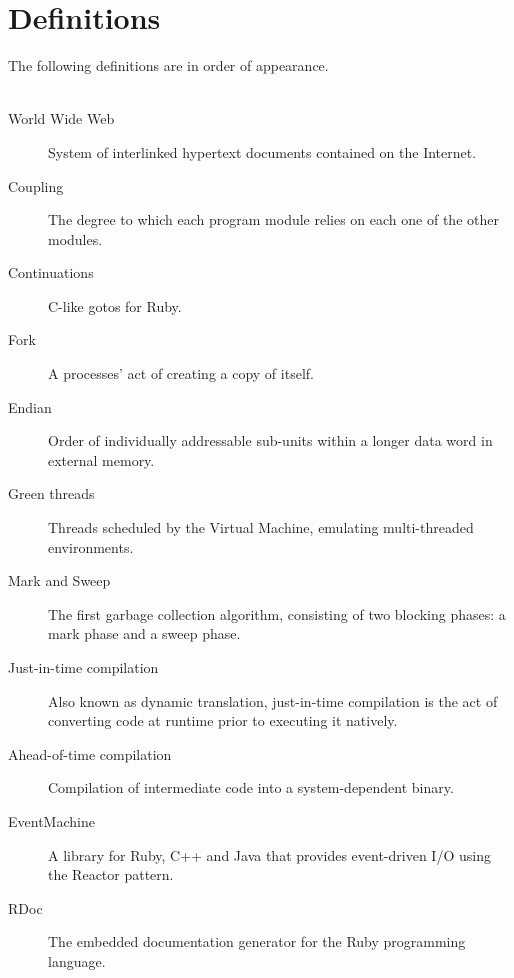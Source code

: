\chapter*{Definitions} %
\label{cha:definitions}
The following definitions are in order of appearance.\\\\

\begin{description}
  \item[World Wide Web] System of interlinked hypertext documents contained on the Internet.
  \item[Coupling] The degree to which each program module relies on each one of the other modules.
  \item[Continuations] C-like gotos for Ruby.
  \item[Fork] A processes' act of creating a copy of itself.
  \item[Endian] Order of individually addressable sub-units within a longer data word in external memory.
  \item[Green threads] Threads scheduled by the Virtual Machine, emulating multi-threaded environments.
  \item[Mark and Sweep] The first garbage collection algorithm, consisting of two blocking phases: a mark phase and a sweep phase.
  \item[Just-in-time compilation] Also known as dynamic translation, just-in-time compilation is the act of converting code at runtime prior to executing it natively.
  \item[Ahead-of-time compilation] Compilation of intermediate code into a system-dependent binary.
  \item[EventMachine] A library for Ruby, C++ and Java that provides event-driven I/O using the Reactor pattern.
  \item[RDoc] The embedded documentation generator for the Ruby programming language.
\end{description}

